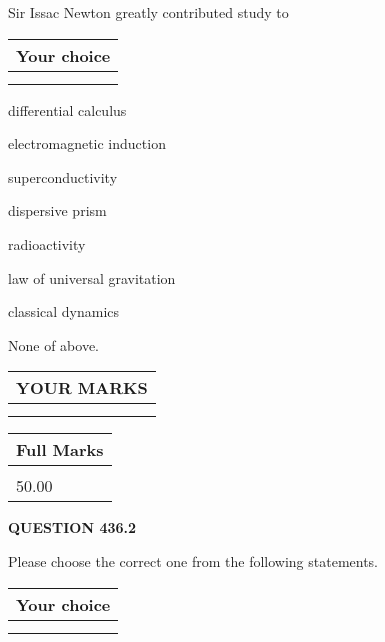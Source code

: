 \documentclass[12pt]{article}
\begin{document}
  
Sir Issac Newton greatly contributed study to
  
  
\noindent\hspace{3.0in} \begin{tabular}{|l|}
\hline
Your choice \\
\hline
 \\ 
 \\ 
\hline
\end{tabular}
  
  
 
 
differential calculus
 
 
electromagnetic induction
 
 
superconductivity
 
 
dispersive prism
 
 
radioactivity
 
 
law of universal gravitation
 
 
classical dynamics
 
 
 None of above.
 
 
  
\vspace{0.2in}
  
\noindent\begin{tabular}{|l|}
\hline
 YOUR MARKS  \\
\hline
 \\ 
 \\ 
\hline
\end{tabular}
\hspace{0.05in} \begin{tabular}{|l|}
\hline
 Full Marks  \\
\hline
 \\ 
50.00 \\
\hline
\end{tabular}
{\textbf{\Large{QUESTION
436.2 
}}}
  
  
Please choose the correct one from the following statements.
  
  
\noindent\hspace{3.0in} \begin{tabular}{|l|}
\hline
Your choice \\
\hline
 \\ 
 \\ 
\hline
\end{tabular}
  
\end{document}
